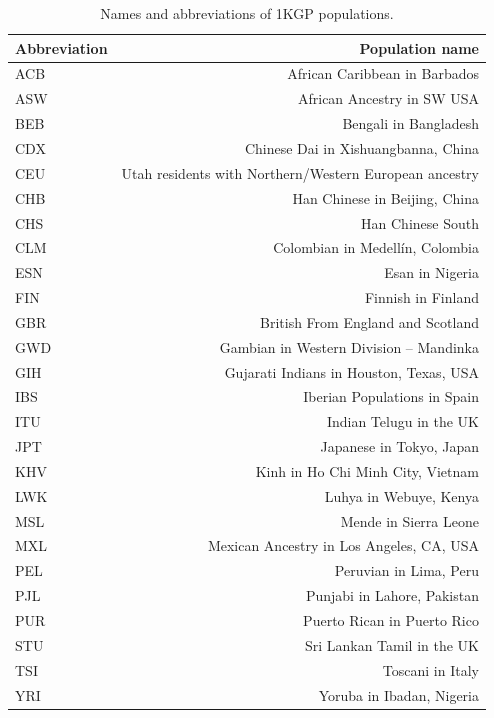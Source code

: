 \begin{table}[ht]
\centering
\begin{tabular}{l|r}
Abbreviation & Population name\\
\hline
 ACB & African Caribbean in Barbados\\
 \hline
    ASW & African Ancestry in SW USA \\
 \hline
    BEB & Bengali in Bangladesh\\
 \hline
    CDX & Chinese Dai in Xishuangbanna, China\\
 \hline
    CEU & Utah residents with Northern/Western European ancestry\\
 \hline
    CHB & Han Chinese in Beijing, China\\
 \hline
    CHS & Han Chinese South\\
 \hline
    CLM & Colombian in Medell\'{i}n, Colombia\\
 \hline
    ESN & Esan in Nigeria\\
 \hline
    FIN & Finnish in Finland\\
 \hline
    GBR & British From England and Scotland\\
 \hline
    GWD & Gambian in Western Division -- Mandinka\\
 \hline
    GIH & Gujarati Indians in Houston, Texas, USA\\
 \hline
    IBS & Iberian Populations in Spain\\
 \hline
    ITU & Indian Telugu in the UK\\
 \hline
    JPT & Japanese in Tokyo, Japan\\
 \hline
    KHV & Kinh in Ho Chi Minh City, Vietnam\\
 \hline
    LWK & Luhya in Webuye, Kenya\\
 \hline
    MSL & Mende in Sierra Leone\\
 \hline
    MXL & Mexican Ancestry in Los Angeles, CA, USA\\
 \hline
    PEL & Peruvian in Lima, Peru\\
 \hline
    PJL & Punjabi in Lahore, Pakistan\\
 \hline
    PUR & Puerto Rican in Puerto Rico\\
 \hline
    STU & Sri Lankan Tamil in the UK\\
 \hline
    TSI & Toscani in Italy\\
 \hline
    YRI & Yoruba in Ibadan, Nigeria\\
\end{tabular}
\caption{Names and abbreviations of 1KGP populations.}
\label{table:1kgp_labels} 
\end{table} 

